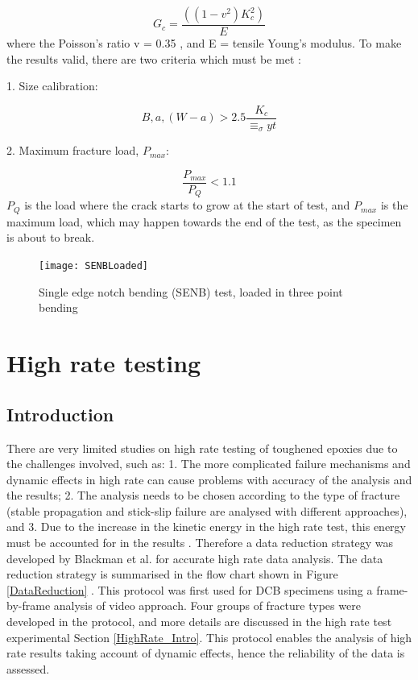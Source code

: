 \documentclass[numbers=noendperiod,chapterprefix=on]{icldt} %
\begin{document}
\begin{equation} 
G_c= \frac{((1-v^2) K_c^2)}{E}
\end{equation}
where the Poisson's ratio v = 0.35 \cite{Karac2011}, and E = tensile Young's modulus. 
To make the results valid, there are two criteria which must be met \cite{D50232007}:

1. Size calibration:

\begin{equation} 
B,a,(W-a)>2.5 \frac{K_c}{\equiv_\sigma{yt}}
\end{equation}


2. Maximum fracture load, $P_{max}$:

\begin{equation} 
\frac{P_{max}}{P_Q}<1.1
\end{equation}
$ P_{Q} $ is the load where the crack starts to grow at the start of test, and $P_{max}$ is the maximum load, which may happen towards the end of the test, as the specimen is about to break.

\begin{figure}[!htpb]
\centering
\texttt{[image: SENBLoaded]}
\caption{Single edge notch bending (SENB) test, loaded in three point bending \cite{Karac2011}} \label{SENBLoaded}
\end{figure}


\section{High rate testing} \label{High_rate_lit}
\subsection{Introduction} 
There are very limited studies on high rate testing of toughened epoxies due to the challenges involved, such as: 1. The more complicated failure mechanisms and dynamic effects in high rate can cause problems with accuracy of the analysis and the results; 2. The analysis needs to be chosen according to the type of fracture (stable propagation and stick-slip failure are analysed with different approaches), and 3. Due to the increase in the kinetic energy in the high rate test, this energy must be accounted for in the results \cite{Bagheri2000}.
Therefore a data reduction strategy was developed by Blackman et al. \cite{Huang1992} for accurate high rate data analysis. The data reduction strategy is summarised in the flow chart shown in Figure \ref{DataReduction} \cite{Huang1992}. This protocol was first used for DCB specimens using a frame-by-frame analysis of video approach. Four groups of fracture types were developed in the protocol, and more details are discussed in the high rate test experimental Section \ref{HighRate_Intro}. This protocol enables the analysis of high rate results taking account of dynamic effects, hence the reliability of the data is assessed.
\end{document}
